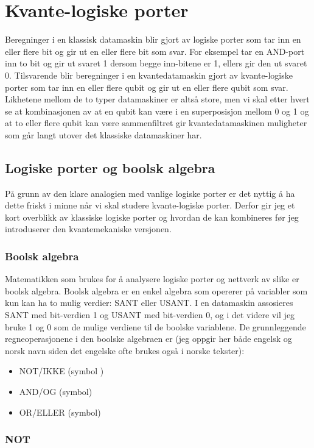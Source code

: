 \chapter{Kvante-logiske porter}

Beregninger i en klassisk datamaskin blir gjort av logiske porter som tar inn en eller flere bit og gir ut en eller flere bit som svar. For eksempel tar en AND-port inn to bit og gir ut svaret 1 dersom begge inn-bitene er 1, ellers gir den ut svaret 0. Tilsvarende blir beregninger i en kvantedatamaskin gjort av kvante-logiske porter som tar inn en eller flere qubit og gir ut en eller flere qubit som svar. Likhetene mellom de to typer datamaskiner er altså store, men vi skal etter hvert se at kombinasjonen av at en qubit kan være i en superposisjon mellom 0 og 1 og at to eller flere qubit kan være sammenfiltret gir kvantedatamaskinen muligheter som går langt utover det klassiske datamaskiner har.

\section{Logiske porter og boolsk algebra}
På grunn av den klare analogien med vanlige logiske porter er det nyttig å ha dette friskt i minne når vi skal studere kvante-logiske porter. Derfor gir jeg et kort overblikk av klassiske logiske porter og hvordan de kan kombineres før jeg introduserer den kvantemekaniske versjonen. 

\subsection{Boolsk algebra}
Matematikken som brukes for å analysere logiske porter og nettverk av slike er boolsk algebra. Boolsk algebra er en enkel algebra som opererer på variabler som kun kan ha to mulig verdier: SANT eller USANT. I en datamaskin assosieres SANT med bit-verdien 1 og USANT med bit-verdien 0, og i det videre vil jeg bruke 1 og 0 som de mulige verdiene til de boolske variablene. De grunnleggende regneoperasjonene i den boolske algebraen er (jeg oppgir her både engelsk og norsk navn siden det engelske ofte brukes også i norske tekster):
\begin{itemize}
\item
NOT/IKKE (symbol )
\item
AND/OG (symbol)
\item
OR/ELLER (symbol) 
\end{itemize}

\subsection{NOT}